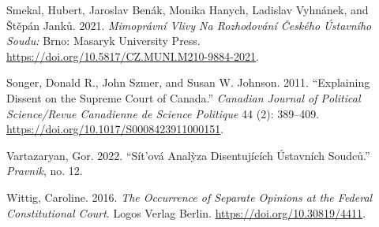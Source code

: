 \documentclass[
  11pt,
]{article}
\newlength{\cslhangindent}
\newenvironment{CSLReferences}[2] %
 {\begin{list}{}{%
  \setlength{\itemindent}{0pt}
  \setlength{\leftmargin}{0pt}
  \setlength{\parsep}{0pt}
  \ifodd #1
   \setlength{\leftmargin}{\cslhangindent}
   \setlength{\itemindent}{-1\cslhangindent}
  \fi
  \setlength{\itemsep}{#2\baselineskip}}}
 {\end{list}}
\begin{document}
\begin{CSLReferences}{1}{0}
Smekal, Hubert, Jaroslav Benák, Monika Hanych, Ladislav Vyhnánek, and Štěpán Janků. 2021. \emph{Mimoprávní Vlivy Na Rozhodování Českého {Ústavního} Soudu:} Brno: Masaryk University Press. \url{https://doi.org/10.5817/CZ.MUNI.M210-9884-2021}.

Songer, Donald R., John Szmer, and Susan W. Johnson. 2011. {``Explaining {Dissent} on the {Supreme Court} of {Canada}.''} \emph{Canadian Journal of Political Science/Revue Canadienne de Science Politique} 44 (2): 389--409. \url{https://doi.org/10.1017/S0008423911000151}.

Vartazaryan, Gor. 2022. {``Sít'ová Analỳza Disentujících Ústavních Soudců.''} \emph{Pravnik}, no. 12.

Wittig, Caroline. 2016. \emph{The {Occurrence} of {Separate Opinions} at the {Federal Constitutional Court}}. Logos Verlag Berlin. \url{https://doi.org/10.30819/4411}.

\end{CSLReferences}
\end{document}
